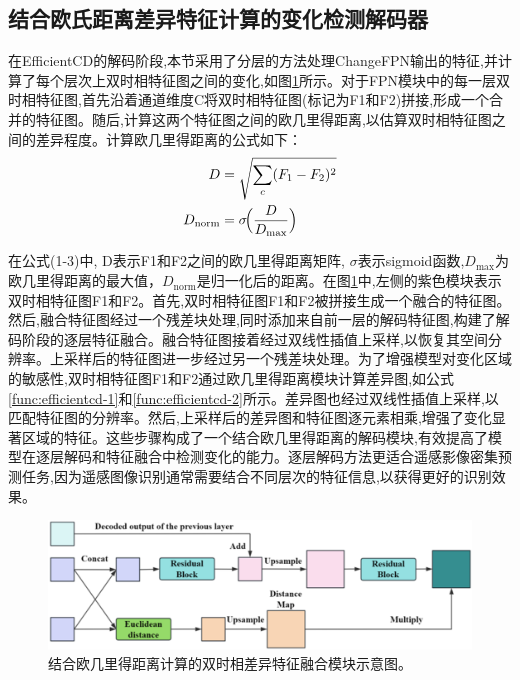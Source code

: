 \subsection{结合欧氏距离差异特征计算的变化检测解码器}

在EfficientCD的解码阶段,本节采用了分层的方法处理ChangeFPN输出的特征,并计算了每个层次上双时相特征图之间的变化,如图\ref{fig:efficientcd_euclidean}所示。对于FPN模块中的每一层双时相特征图,首先沿着通道维度C将双时相特征图(标记为F1和F2)拼接,形成一个合并的特征图。随后,计算这两个特征图之间的欧几里得距离,以估算双时相特征图之间的差异程度。计算欧几里得距离的公式如下：
\begin{align}
D &= \sqrt{\sum_{c}(F_{1} - F_{2})^{2}} \label{func:efficientcd-1} \\
D_{\mathrm{norm}} &= \sigma\!\Bigl(\frac{D}{D_{\max}}\Bigr) \label{func:efficientcd-2}
\end{align}


在公式(1-3)中, D表示F1和F2之间的欧几里得距离矩阵, $\sigma$表示sigmoid函数,${D_{\max}}$为欧几里得距离的最大值，$D_{\mathrm{norm}}$是归一化后的距离。在图\ref{fig:efficientcd_euclidean}中,左侧的紫色模块表示双时相特征图F1和F2。首先,双时相特征图F1和F2被拼接生成一个融合的特征图。然后,融合特征图经过一个残差块处理,同时添加来自前一层的解码特征图,构建了解码阶段的逐层特征融合。融合特征图接着经过双线性插值上采样,以恢复其空间分辨率。上采样后的特征图进一步经过另一个残差块处理。为了增强模型对变化区域的敏感性,双时相特征图F1和F2通过欧几里得距离模块计算差异图,如公式\ref{func:efficientcd-1}和\ref{func:efficientcd-2}所示。差异图也经过双线性插值上采样,以匹配特征图的分辨率。然后,上采样后的差异图和特征图逐元素相乘,增强了变化显著区域的特征。这些步骤构成了一个结合欧几里得距离的解码模块,有效提高了模型在逐层解码和特征融合中检测变化的能力。逐层解码方法更适合遥感影像密集预测任务,因为遥感图像识别通常需要结合不同层次的特征信息,以获得更好的识别效果。

\begin{figure}[!htb]
  \centering
  \includegraphics[width=\textwidth]{paper_figures/基于双时相遥感影像特征交互的变化检测算法研究/EfficientCD/efficientcd_euclidean.png}
  \caption{结合欧几里得距离计算的双时相差异特征融合模块示意图。}
  \label{fig:efficientcd_euclidean}
\end{figure}

